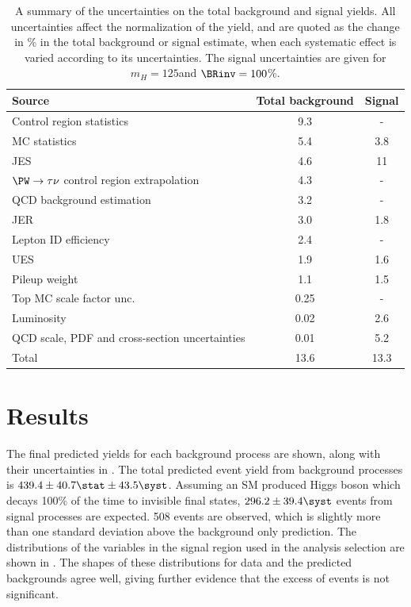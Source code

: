\begin{table}
  \caption{A summary of the uncertainties on the total background and signal yields. All uncertainties affect the normalization of the yield, and are quoted as the change in \% in the total background or signal estimate, when each systematic effect is varied according to its uncertainties. The signal uncertainties are given for $m_{H}=125$\GeV and $\BRinv=100$\%.}
  \label{tab:parkedsyst}
  \begin{tabular}{lcc}
    \hline \hline
    Source  & Total background & Signal     \\
    \hline
    Control region statistics & 9.3 & - \\
    MC statistics & 5.4 & 3.8 \\
    \ac{JES} & 4.6 & 11 \\
    $\PW\rightarrow\tau\nu$ control region extrapolation & 4.3 & - \\
    QCD background estimation & 3.2 & - \\
    \ac{JER} & 3.0 & 1.8 \\
    Lepton ID efficiency & 2.4 & - \\
    \ac{UES} & 1.9 & 1.6 \\
    Pileup weight & 1.1 & 1.5 \\
    Top MC scale factor unc. & 0.25 & - \\
    Luminosity & 0.02 & 2.6 \\
    QCD scale, PDF and cross-section uncertainties & 0.01 & 5.2 \\
    \hline
    Total & 13.6 & 13.3 \\
    \hline \hline
  \end{tabular}
\end{table}




\section{Results}                                                                                                                                        
\label{sec:parkedresults}
The final predicted yields for each background process are shown, along with their uncertainties in . The total predicted event yield from background processes is $439.4\pm 40.7\stat\pm 43.5 \syst$. Assuming an \ac{SM} produced Higgs boson which decays 100\% of the time to invisible final states, $296.2\pm 39.4\syst$ events from signal processes are expected. 508 events are observed, which is slightly more than one standard deviation above the background only prediction. The distributions of the variables in the signal region used in the analysis selection are shown in . The shapes of these distributions for data and the predicted backgrounds agree well, giving further evidence that the excess of events is not significant.

